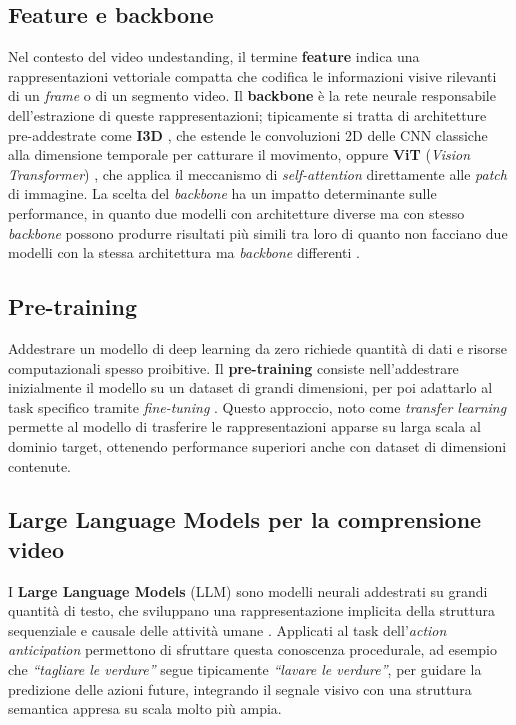 \subsection{Feature e backbone}
Nel contesto del video undestanding, il termine \textbf{feature} indica una rappresentazioni vettoriale compatta che codifica le informazioni visive rilevanti di un \textit{frame} o di un segmento video. Il \textbf{backbone} è la rete neurale responsabile dell'estrazione di queste rappresentazioni; tipicamente si tratta di architetture pre-addestrate come \textbf{I3D} \cite{carreira2017quo}, che estende le convoluzioni 2D delle CNN classiche alla dimensione temporale per catturare il movimento, oppure \textbf{ViT} (\textit{Vision Transformer}) \cite{dosovitskiy2020image}, che applica il meccanismo di \textit{self-attention} direttamente alle \textit{patch} di immagine. La scelta del \textit{backbone} ha un impatto determinante sulle performance, in quanto due modelli con architetture diverse ma con stesso \textit{backbone} possono produrre risultati più simili tra loro di quanto non facciano due modelli con la stessa architettura ma \textit{backbone} differenti \cite{lai2024human}.
\subsection{Pre-training}
Addestrare un modello di deep learning da zero richiede quantità di dati e risorse computazionali spesso proibitive. Il \textbf{pre-training} consiste nell'addestrare inizialmente il modello su un dataset di grandi dimensioni, per poi adattarlo al task specifico tramite \textit{fine-tuning} \cite{goodfellow2016deep}. Questo approccio, noto come \textit{transfer learning} permette al modello di trasferire le rappresentazioni apparse su larga scala al dominio target, ottenendo performance superiori anche con dataset di dimensioni contenute. 
\subsection{Large Language Models per la comprensione video}
I \textbf{Large Language Models} (LLM) sono modelli neurali addestrati su grandi quantità di testo, che sviluppano una rappresentazione implicita della struttura sequenziale e causale delle attività umane \cite{mittal2024can}. Applicati al task dell'\textit{action anticipation} permettono di sfruttare questa conoscenza procedurale, ad esempio che \textit{``tagliare le verdure''} segue tipicamente \textit{``lavare le verdure''}, per guidare la predizione delle azioni future, integrando il segnale visivo con una struttura semantica appresa su scala molto più ampia.